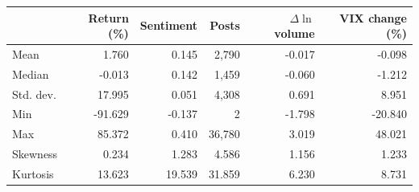 \begin{tabular}{lrrrrr}
\toprule
 & Return (\%) & Sentiment & Posts & $\Delta\ln$ volume & VIX change (\%) \\
\midrule
Mean & 1.760 & 0.145 & 2,790 & -0.017 & -0.098 \\
Median & -0.013 & 0.142 & 1,459 & -0.060 & -1.212 \\
Std. dev. & 17.995 & 0.051 & 4,308 & 0.691 & 8.951 \\
Min & -91.629 & -0.137 & 2 & -1.798 & -20.840 \\
Max & 85.372 & 0.410 & 36,780 & 3.019 & 48.021 \\
Skewness & 0.234 & 1.283 & 4.586 & 1.156 & 1.233 \\
Kurtosis & 13.623 & 19.539 & 31.859 & 6.230 & 8.731 \\
\bottomrule
\end{tabular}
